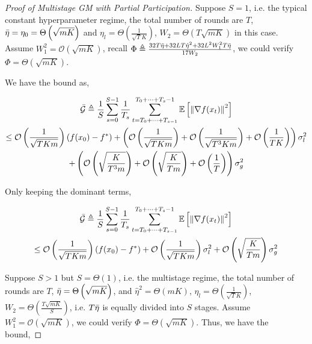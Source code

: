 \begin{proof}[Proof of Multistage GM with Partial Participation]
Suppose $S=1$, i.e. the typical constant hyperparameter regime, the total number of rounds are $T$, $\Bar{\eta}=\eta_0=\Theta\left(\sqrt{m K}\right)$ and $\eta_l=\Theta\left(\frac{1}{\sqrt{T}K}\right)$, $W_2=\Theta\left(T\sqrt{m K}\right)$ in this case. Assume $W_1^2=\mathcal{O}\left(\sqrt{mK}\right)$, recall $\Phi \triangleq \frac{32 T \Bar{\eta} + 32 L T \hat{\eta}^2 + 32 L^2 W_1^2 T \Bar{\eta}}{17 W_2}$, we could verify $\Phi = \Theta\left(\sqrt{m K}\right)$.

We have the bound as,

\begin{equation}
\begin{gathered}
\Bar{\mathcal{G}}\triangleq\frac{1}{S}\sum_{s=0}^{S-1} \frac{1}{T_s}\sum_{t=T_0+\dots+T_{s-1} }^{T_0+\dots+T_s-1} \mathbb{E}\left[\left\|\nabla f(x_t)\right\|^2\right]\\
\leq  \mathcal{O}\left(\frac{1}{\sqrt{T K m}}\right) \left(f(x_0)-f^\ast\right) + \left( \mathcal{O}\left(\frac{1}{\sqrt{T K m}}\right) + \mathcal{O}\left(\frac{1}{\sqrt{T^3 K m}}\right) + \mathcal{O}\left(\frac{1}{TK}\right) \right)  \sigma_l^2\\
+ \left( \mathcal{O}\left( \sqrt{\frac{K}{T^3 m}}  \right) + \mathcal{O}\left( \sqrt{\frac{K}{T m}}  \right) + \mathcal{O}\left(\frac{1}{T}\right) \right) \sigma_g^2
\end{gathered}\nonumber
\end{equation}

Only keeping the dominant terms,

\begin{equation}
\begin{gathered}
\Bar{\mathcal{G}}\triangleq\frac{1}{S}\sum_{s=0}^{S-1} \frac{1}{T_s}\sum_{t=T_0+\dots+T_{s-1} }^{T_0+\dots+T_s-1} \mathbb{E}\left[\left\|\nabla f(x_t)\right\|^2\right]\\
\leq  \mathcal{O}\left(\frac{1}{\sqrt{T K m}}\right) \left(f(x_0)-f^\ast\right) +   \mathcal{O}\left(\frac{1}{\sqrt{T K m}}\right)     \sigma_l^2 
+  \mathcal{O}\left( \sqrt{\frac{K}{T m}}  \right)   \sigma_g^2
\end{gathered}\nonumber
\end{equation}


Suppose $S>1$ but $S=\Theta(1)$, i.e. the multistage regime, the total number of rounds are $T$, $\Bar{\eta} = \Theta\left(\sqrt{mK}\right)$, and $\hat{\eta}^2 = \Theta\left(mK\right)$, $\eta_l=\Theta\left(\frac{1}{\sqrt{T}K}\right)$, $W_2=\Theta\left(\frac{T\sqrt{mK}}{S}\right)$, i.e. $T\Bar{\eta}$ is equally divided into $S$ stages. Assume $W_1^2=\mathcal{O}\left(\sqrt{mK}\right)$, we could verify $\Phi=\Theta(\sqrt{mK})$. Thus, we have the bound,


\end{proof}
